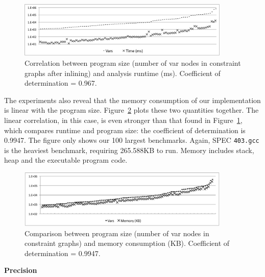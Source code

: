 \documentclass{paper}
\begin{document}
\begin{figure}[t!]
\begin{center}
\includegraphics[width=0.9\textwidth]{images/TimeCorr}
\end{center}
\caption{\label{fig:TimeCorr}
Correlation between program size (number of var nodes in constraint
graphs after inlining) and analysis runtime (ms).
Coefficient of determination = 0.967.
}
\end{figure}

The experiments also reveal that the memory consumption of our implementation
is linear with the program size.
Figure~\ref{fig:MemCorr} plots these two quantities together.
The linear correlation, in this case, is even stronger than that found in
Figure~\ref{fig:TimeCorr}, which compares runtime and program size: the
coefficient of determination is 0.9947.
The figure only shows our 100 largest benchmarks.
Again, SPEC \texttt{403.gcc} is the heaviest benchmark, requiring
265.588KB to run.
Memory includes stack, heap and the executable program code.

\begin{figure}[t!]
\begin{center}
\includegraphics[width=0.9\textwidth]{images/MemCorr}
\end{center}
\caption{\label{fig:MemCorr}
Comparison between program size (number of var nodes in constraint
graphs) and memory consumption (KB).
Coefficient of determination = 0.9947.
}
\end{figure}

\noindent
\textbf{Precision}
\end{document}
